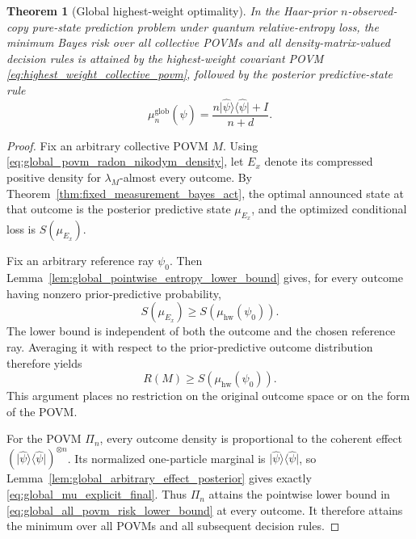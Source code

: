 \documentclass[journal]{IEEEtran}
\newtheorem{theorem}{Theorem}
\newcommand{\ket}[1]{\lvert #1\rangle}
\newcommand{\bra}[1]{\langle #1\rvert}
\begin{document}
\begin{theorem}[Global highest-weight optimality]
\label{thm:highest_weight_global_optimality}
In the Haar-prior \(n\)-observed-copy pure-state prediction problem under
quantum relative-entropy loss, the minimum Bayes risk over all collective POVMs
and all density-matrix-valued decision rules is attained by the highest-weight
covariant POVM \eqref{eq:highest_weight_collective_povm}, followed by the
posterior predictive-state rule
\begin{equation}
    \mu_n^{\mathrm{glob}}(\hat\psi)
    =
    \frac{n\ket{\hat\psi}\bra{\hat\psi}+I}{n+d}.
    \label{eq:global_mu_explicit_final}
\end{equation}
\end{theorem}

\begin{proof}
Fix an arbitrary collective POVM \(M\).  Using
\eqref{eq:global_povm_radon_nikodym_density}, let \(E_x\) denote its compressed
positive density for \(\lambda_M\)-almost every outcome.  By
Theorem~\ref{thm:fixed_measurement_bayes_act}, the optimal announced state at
that outcome is the posterior predictive state \(\mu_{E_x}\), and the optimized
conditional loss is \(S(\mu_{E_x})\).

Fix an arbitrary reference ray \(\psi_0\).  Then
Lemma~\ref{lem:global_pointwise_entropy_lower_bound} gives, for every outcome
having nonzero prior-predictive probability,
\[
    S(\mu_{E_x})
    \ge
    S\!\left(\mu_{\mathrm{hw}}(\psi_0)\right).
\]
The lower bound is independent of both the outcome and the chosen reference ray.  Averaging it with respect to
the prior-predictive outcome distribution therefore yields
\begin{equation}
    R(M)
    \ge
    S\!\left(\mu_{\mathrm{hw}}(\psi_0)\right).
    \label{eq:global_all_povm_risk_lower_bound}
\end{equation}
This argument places no restriction on the original outcome space or on the
form of the POVM.

For the POVM \(\Pi_n\), every outcome density is proportional to the coherent
effect \((\ket{\hat\psi}\bra{\hat\psi})^{\otimes n}\).  Its normalized
one-particle marginal is \(\ket{\hat\psi}\bra{\hat\psi}\), so
Lemma~\ref{lem:global_arbitrary_effect_posterior} gives exactly
\eqref{eq:global_mu_explicit_final}.  Thus \(\Pi_n\) attains the pointwise lower
bound in \eqref{eq:global_all_povm_risk_lower_bound} at every outcome.  It
therefore attains the minimum over all POVMs and all subsequent decision rules.
\end{proof}
\end{document}
